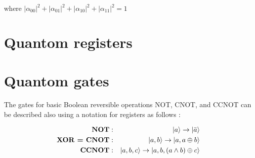 \documentclass[12pt]{book}
\begin{document}
where $|\alpha_{00}|^{2}+ |\alpha_{01}|^{2} +|\alpha_{10}|^{2} +|\alpha_{11}|^{2} = 1$



\section{Quantom registers}


\section{Quantom gates}

The gates for basic Boolean reversible operations NOT, CNOT, and CCNOT can be
described also using a notation for registers as follows :


\begin{eqnarray*}
\textbf{NOT}&:&\ket{a} \to \ket{\bar{a}}\\
\textbf{XOR = CNOT} &:&  \ket{a , b} \to \ket{a ,  a \oplus b} \\
\textbf{CCNOT} &:& \ket{a , b, c} \to \ket{a , b ,  ( a \wedge b ) \oplus c}
\end{eqnarray*}
\end{document}
